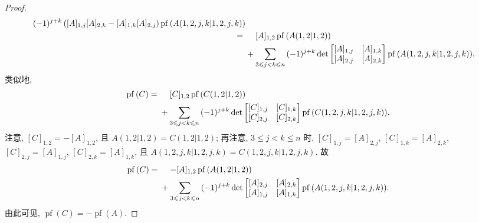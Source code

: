 \documentclass[../libro.tex]{subfiles}
\begin{document}
\begin{proof}
\begin{align*}
        {
            (-1)^{j + k}\,
            ([A]_{1,j} [A]_{2,k} - [A]_{1,k} [A]_{2,j})
            \operatorname{pf} {(A({1,2,j,k}|{1,2,j,k}))}
        }
        \\
        = {} &
        \hphantom{{} + {}}
        [A]_{1,2}
        \operatorname{pf} {(A({1,2}|{1,2}))}
        \\
        &
        +
        \sum_{3 \leq j < k \leq n}
        {
            (-1)^{j + k}
            \det {
                \begin{bmatrix}
                    [A]_{1,j} & [A]_{1,k} \\
                    [A]_{2,j} & [A]_{2,k} \\
                \end{bmatrix}
            }
            \operatorname{pf} {(A({1,2,j,k}|{1,2,j,k}))}
        }.
    \end{align*}
    类似地,
    \begin{align*}
        \operatorname{pf} {(C)}
        = {} &
        \hphantom{{} + {}}
        [C]_{1,2}
        \operatorname{pf} {(C({1,2}|{1,2}))}
        \\
        &
        +
        \sum_{3 \leq j < k \leq n}
        {
            (-1)^{j + k}
            \det {
                \begin{bmatrix}
                    [C]_{1,j} & [C]_{1,k} \\
                    [C]_{2,j} & [C]_{2,k} \\
                \end{bmatrix}
            }
            \operatorname{pf} {(C({1,2,j,k}|{1,2,j,k}))}
        }.
    \end{align*}
    注意, \([C]_{1,2} = -[A]_{1,2}\),
    且 \(A({1,2}|{1,2}) = C({1,2}|{1,2})\);
    再注意, \(3 \leq j < k \leq n\) 时,
    \([C]_{1,j} = [A]_{2,j}\),
    \([C]_{1,k} = [A]_{2,k}\),
    \([C]_{2,j} = [A]_{1,j}\),
    \([C]_{2,k} = [A]_{1,k}\),
    且 \(A({1,2,j,k}|{1,2,j,k}) = C({1,2,j,k}|{1,2,j,k})\).
    故
    \begin{align*}
        \operatorname{pf} {(C)}
        = {} &
        \hphantom{{} + {}}
        {-} [A]_{1,2}
        \operatorname{pf} {(A({1,2}|{1,2}))}
        \\
        &
        +
        \sum_{3 \leq j < k \leq n}
        {
            (-1)^{j + k}
            \det {
                \begin{bmatrix}
                    [A]_{2,j} & [A]_{2,k} \\
                    [A]_{1,j} & [A]_{1,k} \\
                \end{bmatrix}
            }
            \operatorname{pf} {(A({1,2,j,k}|{1,2,j,k}))}
        }.
    \end{align*}
    由此可见, \(\operatorname{pf} {(C)}
    = -\operatorname{pf} {(A)}\).


\end{proof}
\end{document}
